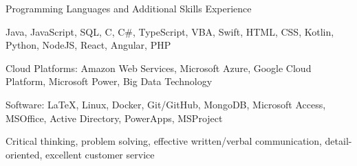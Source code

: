 \begin{cventries}
  \cventry
    {Programming Languages and Additional Skills Experience}
    { }
    { }
    { }
    {
      \begin{cvitems}
        \item {Java, JavaScript, SQL, C, C\#, TypeScript, VBA, Swift, HTML, CSS, Kotlin, Python, NodeJS, React, Angular, PHP}
        \item {Cloud Platforms: Amazon Web Services, Microsoft Azure, Google Cloud Platform, Microsoft Power, Big Data Technology}
        \item {Software: LaTeX, Linux, Docker, Git/GitHub, MongoDB, Microsoft Access, MSOffice, Active Directory, PowerApps, MSProject}
        \item {Critical thinking, problem solving, effective written/verbal communication, detail-oriented, excellent customer service}
      \end{cvitems}
    }
\end{cventries}
